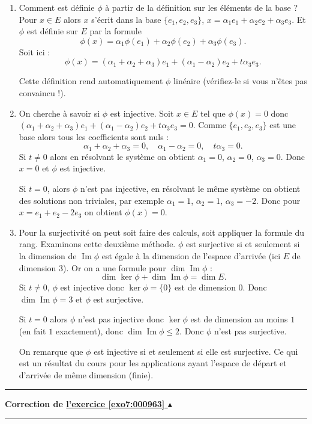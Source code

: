 \documentclass[11pt,a4paper]{article}
\renewcommand{\Im}{\mathop{\mathrm{Im}}\nolimits}
\newcounter{exo}
\newcommand{\correction}[1]{\hypertarget{cor7:#1}{}\label{cor7:#1}{\bf Correction de \hyperlink{exo7:#1}{l'exercice \ref{exo7:#1} $\blacktriangle$}}\vspace{1mm}\hrule\vspace{1mm}}
\newcommand{\fincorrection}{\vspace{1mm}\hrule\vspace*{7mm}}
\begin{document}
\begin{enumerate}
  \item Comment est d\'efinie $\phi$ \`a partir de la d\'efinition sur les \'el\'ements de la base ?
Pour  $x\in E$ alors $x$ s'\'ecrit dans la base  $\{e_1,e_2,e_3\}$, $x=\alpha_1e_1+\alpha_2e_2+\alpha_3e_3$. 
Et $\phi$ est d\'efinie sur $E$ par la formule
$$\phi(x)=\alpha_1 \phi(e_1) + \alpha_2 \phi(e_2) + \alpha_3 \phi(e_3).$$
Soit ici :
$$\phi(x) = (\alpha_1+\alpha_2+\alpha_3) e_1 + (\alpha_1-\alpha_2)e_2 + t\alpha_3e_3.$$

Cette d\'efinition rend automatiquement $\phi$ lin\'eaire (v\'erifiez-le si vous n'\^etes pas convaincu !).
  \item On cherche \`a savoir si $\phi$ est injective.
Soit $x\in E$ tel que $\phi(x)=0$ donc
$(\alpha_1+\alpha_2+\alpha_3) e_1 + (\alpha_1-\alpha_2)e_2 + t\alpha_3e_3=0$. Comme $\{e_1,e_2,e_3\}$ est une base alors tous les coefficients sont nuls :
$$\alpha_1+\alpha_2+\alpha_3=0, \quad \alpha_1-\alpha_2=0, \quad  t\alpha_3 = 0.$$
Si $t \neq 0$ alors en résolvant le syst\`eme on obtient $\alpha_1=0$, $\alpha_2=0$,
$\alpha_3=0$. Donc $x=0$ et $\phi$ est injective.

Si $t =0$, alors $\phi$ n'est pas injective, en résolvant le m\^eme syst\`eme on obtient
des solutions non triviales, par exemple $\alpha_1=1$, $\alpha_2=1$, $\alpha_3=-2$.
Donc pour $x= e_1+e_2-2e_3$ on obtient $\phi(x)=0$.

  \item Pour la surjectivité on peut soit faire des calculs, soit appliquer la formule du rang. 
Examinons cette deuxi\`eme m\'ethode. $\phi$ est surjective si et seulement si 
la dimension de $\Im \phi$ est \'egale
\`a la dimension de l'espace d'arriv\'ee (ici $E$ de dimension $3$).
Or on a une formule pour $\dim \Im \phi$ :
$$\dim \ker \phi + \dim \Im \phi = \dim E.$$
Si $t \neq 0$, $\phi$ est injective donc $\ker \phi = \{0\}$ est de dimension $0$.
Donc $\dim \Im \phi =3$ et $\phi$ est surjective.

Si $t = 0$ alors $\phi$ n'est pas injective donc $\ker \phi$ est de dimension au moins $1$
(en fait $1$ exactement), donc  $\dim \Im \phi \leqslant 2$. Donc $\phi$ n'est pas surjective.


On remarque que $\phi$ est injective si et seulement si elle est surjective.
Ce qui est un r\'esultat du cours pour les applications ayant l'espace 
de d\'epart et d'arriv\'ee de m\^eme dimension (finie).
\end{enumerate}
\fincorrection
\correction{000963}
\end{document}
